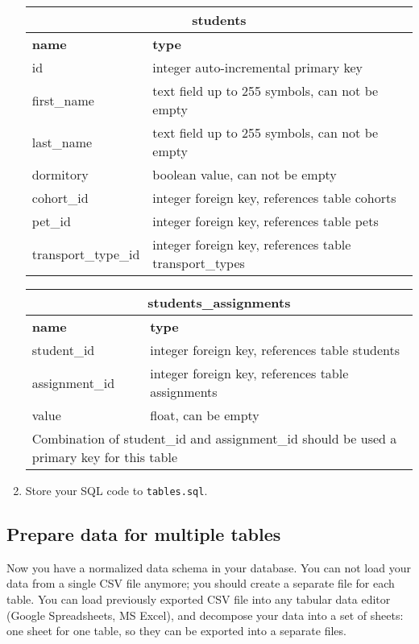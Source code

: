\documentclass[12pt]{article}
\newcommand{\code}[1]{\texttt{#1}}
\begin{document}
\begin{enumerate}
\begin{tabular}{| l | l | }
  \hline
  \multicolumn{2}{|c|}{\textbf{students}}  \\
  \hline
  \textbf{name} & \textbf{type} \\
  \hline
  id & integer auto-incremental primary key \\
  first\_name & text field up to 255 symbols, can not be empty \\
  last\_name & text field up to 255 symbols, can not be empty \\
  dormitory & boolean value, can not be empty \\
  cohort\_id & integer foreign key, references table cohorts \\
  pet\_id  & integer foreign key, references table pets \\
  transport\_type\_id & integer foreign key, references table transport\_types \\
  \hline
\end{tabular}

\begin{tabular}{| l | l | }
  \hline
  \multicolumn{2}{|c|}{\textbf{students\_assignments}}  \\
  \hline
  \textbf{name} & \textbf{type} \\
  \hline
  student\_id & integer foreign key, references table students \\
  assignment\_id & integer foreign key, references table assignments \\
  value & float, can be empty \\
  \hline
  \multicolumn{2}{|p{12cm}|}{ Combination of student\_id and assignment\_id should be used a primary key for this table }  \\
  \hline
\end{tabular}

\item Store your SQL code to \code{tables.sql}.

\end{enumerate}

\subsection*{Prepare data for multiple tables}

Now you have a normalized data schema in your database. You can not load your data from a single CSV file anymore; you should create a separate file for each table. You can load previously exported CSV file into any tabular data editor (Google Spreadsheets, MS Excel), and decompose your data into a set of sheets: one sheet for one table, so they can be exported into a separate files.
\end{document}
